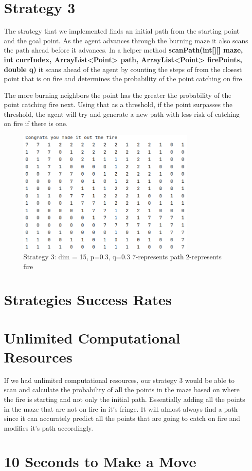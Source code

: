 \documentclass{article}
\begin{document}
\section{Strategy 3}
The strategy that we implemented finds an initial path from the starting point and the goal point. As the agent advances through the burning maze it also scans the path ahead before it advances. In a helper method \textbf{scanPath(int[][] maze, int currIndex, ArrayList<Point> path, ArrayList<Point> firePoints, double q)} it scans ahead of the agent by counting the steps of from the closest point that is on fire and determines the probability of the point catching on fire.

   The more burning neighbors the point has the greater the probability of the point catching fire next.  Using that as a threshold, if the point surpasses the threshold, the agent will try and generate a new path with less risk of catching on fire if there is one.  
   
   \begin{figure}[hpt]
   \centering
\includegraphics[width=3.5in]{strat3ex}

\caption{Strategy 3: dim = 15, p=0.3, q=0.3
7-represents path 2-represents fire}
\label{fig:figure6}
\end{figure}

\section{Strategies Success Rates}

\section{Unlimited Computational Resources}
	If we had unlimited computational resources, our strategy 3 would be able to scan and calculate the probability of all the points in the maze based on where the fire is starting and not only the initial path. Essentially adding all the points in the maze that are not on fire in it's fringe. It will almost always find a path since it can accurately predict all the points that are going to catch on fire and modifies it's path accordingly. 

\section{10 Seconds to Make a Move}
	
\end{document}
